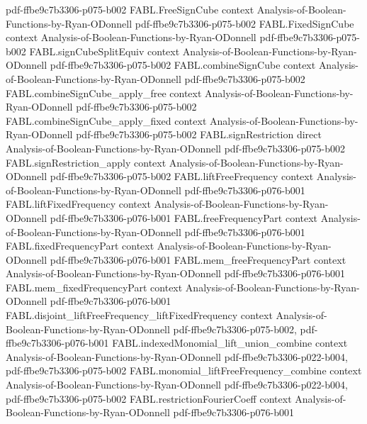 \begin{theorem}
  {pdf-ffbe9c7b3306-p075-b002}
\proofstep
  {FABL.FreeSignCube}
  {context}
  {Analysis-of-Boolean-Functions-by-Ryan-ODonnell}
  {pdf-ffbe9c7b3306-p075-b002}
\proofstep
  {FABL.FixedSignCube}
  {context}
  {Analysis-of-Boolean-Functions-by-Ryan-ODonnell}
  {pdf-ffbe9c7b3306-p075-b002}
\proofstep
  {FABL.signCubeSplitEquiv}
  {context}
  {Analysis-of-Boolean-Functions-by-Ryan-ODonnell}
  {pdf-ffbe9c7b3306-p075-b002}
\proofstep
  {FABL.combineSignCube}
  {context}
  {Analysis-of-Boolean-Functions-by-Ryan-ODonnell}
  {pdf-ffbe9c7b3306-p075-b002}
\proofstep
  {FABL.combineSignCube_apply_free}
  {context}
  {Analysis-of-Boolean-Functions-by-Ryan-ODonnell}
  {pdf-ffbe9c7b3306-p075-b002}
\proofstep
  {FABL.combineSignCube_apply_fixed}
  {context}
  {Analysis-of-Boolean-Functions-by-Ryan-ODonnell}
  {pdf-ffbe9c7b3306-p075-b002}
\proofstep
  {FABL.signRestriction}
  {direct}
  {Analysis-of-Boolean-Functions-by-Ryan-ODonnell}
  {pdf-ffbe9c7b3306-p075-b002}
\proofstep
  {FABL.signRestriction_apply}
  {context}
  {Analysis-of-Boolean-Functions-by-Ryan-ODonnell}
  {pdf-ffbe9c7b3306-p075-b002}
\proofstep
  {FABL.liftFreeFrequency}
  {context}
  {Analysis-of-Boolean-Functions-by-Ryan-ODonnell}
  {pdf-ffbe9c7b3306-p076-b001}
\proofstep
  {FABL.liftFixedFrequency}
  {context}
  {Analysis-of-Boolean-Functions-by-Ryan-ODonnell}
  {pdf-ffbe9c7b3306-p076-b001}
\proofstep
  {FABL.freeFrequencyPart}
  {context}
  {Analysis-of-Boolean-Functions-by-Ryan-ODonnell}
  {pdf-ffbe9c7b3306-p076-b001}
\proofstep
  {FABL.fixedFrequencyPart}
  {context}
  {Analysis-of-Boolean-Functions-by-Ryan-ODonnell}
  {pdf-ffbe9c7b3306-p076-b001}
\proofstep
  {FABL.mem_freeFrequencyPart}
  {context}
  {Analysis-of-Boolean-Functions-by-Ryan-ODonnell}
  {pdf-ffbe9c7b3306-p076-b001}
\proofstep
  {FABL.mem_fixedFrequencyPart}
  {context}
  {Analysis-of-Boolean-Functions-by-Ryan-ODonnell}
  {pdf-ffbe9c7b3306-p076-b001}
\proofstep
  {FABL.disjoint_liftFreeFrequency_liftFixedFrequency}
  {context}
  {Analysis-of-Boolean-Functions-by-Ryan-ODonnell}
  {pdf-ffbe9c7b3306-p075-b002,
    pdf-ffbe9c7b3306-p076-b001}
\proofstep
  {FABL.indexedMonomial_lift_union_combine}
  {context}
  {Analysis-of-Boolean-Functions-by-Ryan-ODonnell}
  {pdf-ffbe9c7b3306-p022-b004,
    pdf-ffbe9c7b3306-p075-b002}
\proofstep
  {FABL.monomial_liftFreeFrequency_combine}
  {context}
  {Analysis-of-Boolean-Functions-by-Ryan-ODonnell}
  {pdf-ffbe9c7b3306-p022-b004,
    pdf-ffbe9c7b3306-p075-b002}
\proofstep
  {FABL.restrictionFourierCoeff}
  {context}
  {Analysis-of-Boolean-Functions-by-Ryan-ODonnell}
  {pdf-ffbe9c7b3306-p076-b001}
\proofstep

\end{theorem}
